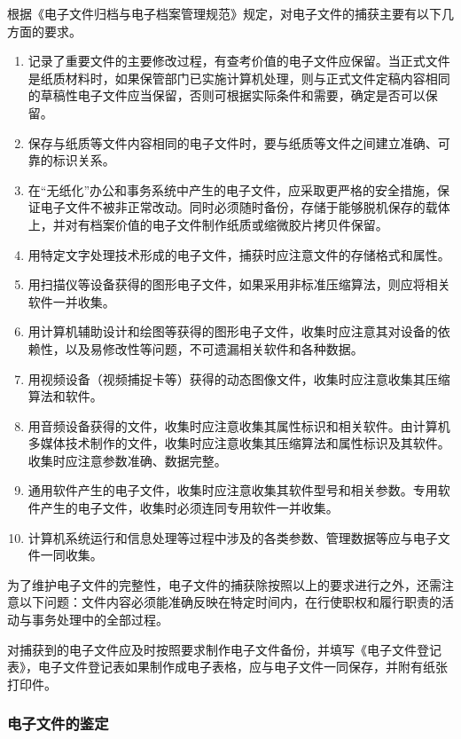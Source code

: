     根据《电子文件归档与电子档案管理规范》规定，对电子文件的捕获主要有以下几方面的要求。

    \begin{enumerate}
        \item 记录了重要文件的主要修改过程，有查考价值的电子文件应保留。当正式文件是纸质材料时，如果保管部门已实施计算机处理，则与正式文件定稿内容相同的草稿性电子文件应当保留，否则可根据实际条件和需要，确定是否可以保留。
        \item 保存与纸质等文件内容相同的电子文件时，要与纸质等文件之间建立准确、可靠的标识关系。
        \item 在“无纸化”办公和事务系统中产生的电子文件，应采取更严格的安全措施，保证电子文件不被非正常改动。同时必须随时备份，存储于能够脱机保存的载体上，并对有档案价值的电子文件制作纸质或缩微胶片拷贝件保留。
        \item 用特定文字处理技术形成的电子文件，捕获时应注意文件的存储格式和属性。
        \item 用扫描仪等设备获得的图形电子文件，如果采用非标准压缩算法，则应将相关软件一并收集。
        \item 用计算机辅助设计和绘图等获得的图形电子文件，收集时应注意其对设备的依赖性，以及易修改性等问题，不可遗漏相关软件和各种数据。
        \item 用视频设备（视频捕捉卡等）获得的动态图像文件，收集时应注意收集其压缩算法和软件。
        \item 用音频设备获得的文件，收集时应注意收集其属性标识和相关软件。由计算机多媒体技术制作的文件，收集时应注意收集其压缩算法和属性标识及其软件。收集时应注意参数准确、数据完整。
        \item 通用软件产生的电子文件，收集时应注意收集其软件型号和相关参数。专用软件产生的电子文件，收集时必须连同专用软件一并收集。
        \item 计算机系统运行和信息处理等过程中涉及的各类参数、管理数据等应与电子文件一同收集。
    \end{enumerate}

    为了维护电子文件的完整性，电子文件的捕获除按照以上的要求进行之外，还需注意以下问题：文件内容必须能准确反映在特定时间内，在行使职权和履行职责的活动与事务处理中的全部过程。

    对捕获到的电子文件应及时按照要求制作电子文件备份，并填写《电子文件登记表》，电子文件登记表如果制作成电子表格，应与电子文件一同保存，并附有纸张打印件。

    \subsubsection {电子文件的鉴定}

